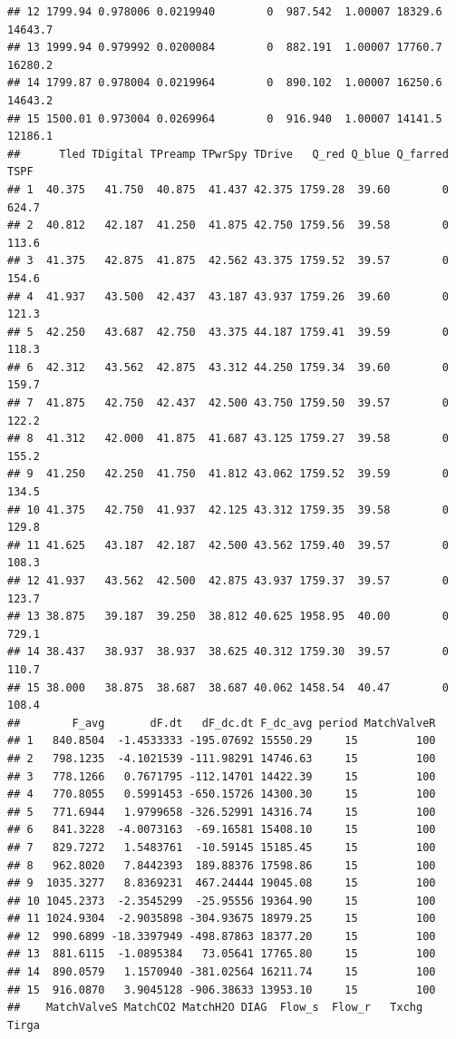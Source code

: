 \documentclass[]{krantz}
\theoremstyle{definition}
\theoremstyle{definition}
\theoremstyle{definition}
\theoremstyle{remark}
\begin{document}
\begin{verbatim}
## 12 1799.94 0.978006 0.0219940        0  987.542  1.00007 18329.6 14643.7
## 13 1999.94 0.979992 0.0200084        0  882.191  1.00007 17760.7 16280.2
## 14 1799.87 0.978004 0.0219964        0  890.102  1.00007 16250.6 14643.2
## 15 1500.01 0.973004 0.0269964        0  916.940  1.00007 14141.5 12186.1
##      Tled TDigital TPreamp TPwrSpy TDrive   Q_red Q_blue Q_farred  TSPF
## 1  40.375   41.750  40.875  41.437 42.375 1759.28  39.60        0 624.7
## 2  40.812   42.187  41.250  41.875 42.750 1759.56  39.58        0 113.6
## 3  41.375   42.875  41.875  42.562 43.375 1759.52  39.57        0 154.6
## 4  41.937   43.500  42.437  43.187 43.937 1759.26  39.60        0 121.3
## 5  42.250   43.687  42.750  43.375 44.187 1759.41  39.59        0 118.3
## 6  42.312   43.562  42.875  43.312 44.250 1759.34  39.60        0 159.7
## 7  41.875   42.750  42.437  42.500 43.750 1759.50  39.57        0 122.2
## 8  41.312   42.000  41.875  41.687 43.125 1759.27  39.58        0 155.2
## 9  41.250   42.250  41.750  41.812 43.062 1759.52  39.59        0 134.5
## 10 41.375   42.750  41.937  42.125 43.312 1759.35  39.58        0 129.8
## 11 41.625   43.187  42.187  42.500 43.562 1759.40  39.57        0 108.3
## 12 41.937   43.562  42.500  42.875 43.937 1759.37  39.57        0 123.7
## 13 38.875   39.187  39.250  38.812 40.625 1958.95  40.00        0 729.1
## 14 38.437   38.937  38.937  38.625 40.312 1759.30  39.57        0 110.7
## 15 38.000   38.875  38.687  38.687 40.062 1458.54  40.47        0 108.4
##        F_avg       dF.dt   dF_dc.dt F_dc_avg period MatchValveR
## 1   840.8504  -1.4533333 -195.07692 15550.29     15         100
## 2   798.1235  -4.1021539 -111.98291 14746.63     15         100
## 3   778.1266   0.7671795 -112.14701 14422.39     15         100
## 4   770.8055   0.5991453 -650.15726 14300.30     15         100
## 5   771.6944   1.9799658 -326.52991 14316.74     15         100
## 6   841.3228  -4.0073163  -69.16581 15408.10     15         100
## 7   829.7272   1.5483761  -10.59145 15185.45     15         100
## 8   962.8020   7.8442393  189.88376 17598.86     15         100
## 9  1035.3277   8.8369231  467.24444 19045.08     15         100
## 10 1045.2373  -2.3545299  -25.95556 19364.90     15         100
## 11 1024.9304  -2.9035898 -304.93675 18979.25     15         100
## 12  990.6899 -18.3397949 -498.87863 18377.20     15         100
## 13  881.6115  -1.0895384   73.05641 17765.80     15         100
## 14  890.0579   1.1570940 -381.02564 16211.74     15         100
## 15  916.0870   3.9045128 -906.38633 13953.10     15         100
##    MatchValveS MatchCO2 MatchH2O DIAG  Flow_s  Flow_r   Txchg   Tirga

\end{verbatim}
\end{document}
